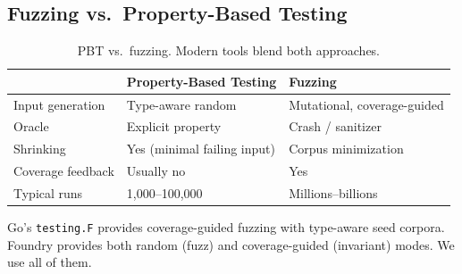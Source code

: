\subsection{Fuzzing vs.\ Property-Based Testing}

\begin{table}[H]
\centering
\small
\begin{tabular}{@{}lll@{}}
\toprule
 & \textbf{Property-Based Testing} & \textbf{Fuzzing} \\
\midrule
Input generation & Type-aware random & Mutational, coverage-guided \\
Oracle & Explicit property & Crash / sanitizer \\
Shrinking & Yes (minimal failing input) & Corpus minimization \\
Coverage feedback & Usually no & Yes \\
Typical runs & 1,000--100,000 & Millions--billions \\
\bottomrule
\end{tabular}
\caption{PBT vs.\ fuzzing. Modern tools blend both approaches.}
\end{table}

Go's \texttt{testing.F} provides coverage-guided fuzzing with type-aware seed corpora.
Foundry provides both random (fuzz) and coverage-guided (invariant) modes. We use all
of them.

